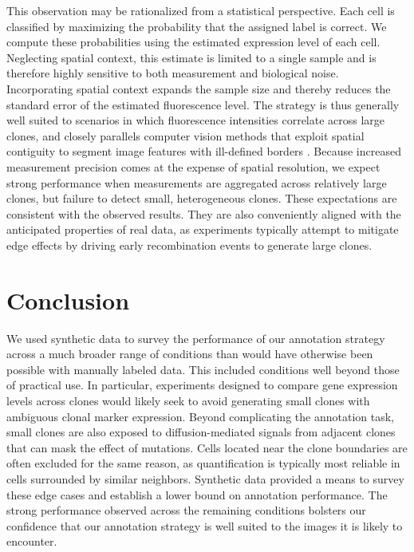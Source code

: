 \documentclass[10pt,letterpaper]{article}
\begin{document}
This observation may be rationalized from a statistical perspective. Each cell is classified by maximizing the probability that the assigned label is correct. We compute these probabilities using the estimated expression level of each cell. Neglecting spatial context, this estimate is limited to a single sample and is therefore highly sensitive to both measurement and biological noise. Incorporating spatial context expands the sample size and thereby reduces the standard error of the estimated fluorescence level. The strategy is thus generally well suited to scenarios in which fluorescence intensities correlate across large clones, and closely parallels computer vision methods that exploit spatial contiguity to segment image features with ill-defined borders \cite{Nguyen2012}. Because increased measurement precision comes at the expense of spatial resolution, we expect strong performance when measurements are aggregated across relatively large clones, but failure to detect small, heterogeneous clones. These expectations are consistent with the observed results. They are also conveniently aligned with the anticipated properties of real data, as experiments typically attempt to mitigate edge effects by driving early recombination events to generate large clones.



\section*{Conclusion}

We used synthetic data to survey the performance of our annotation strategy across a much broader range of conditions than would have otherwise been possible with manually labeled data. This included conditions well beyond those of practical use. In particular, experiments designed to compare gene expression levels across clones would likely seek to avoid generating small clones with ambiguous clonal marker expression. Beyond complicating the annotation task, small clones are also exposed to diffusion-mediated signals from adjacent clones that can mask the effect of mutations. Cells located near the clone boundaries are often excluded for the same reason, as quantification is typically most reliable in cells surrounded by similar neighbors. Synthetic data provided a means to survey these edge cases and establish a lower bound on annotation performance. The strong performance observed across the remaining conditions bolsters our confidence that our annotation strategy is well suited to the images it is likely to encounter.
\end{document}
